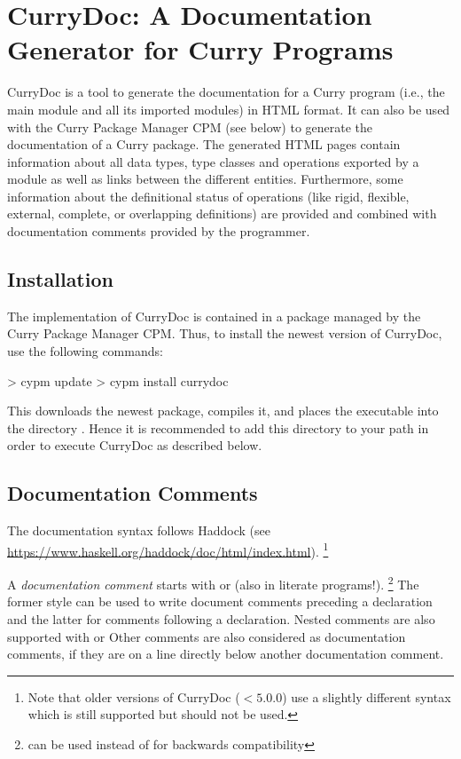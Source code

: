 \section{CurryDoc: A Documentation Generator for Curry Programs}

CurryDoc%
is a tool to generate
the documentation for a Curry program (i.e., the main module
and all its imported modules) in HTML format.
It can also be used with the Curry Package Manager CPM
(see below) to generate the documentation of a Curry package.
The generated HTML pages contain information about
all data types, type classes and operations exported by a module as well
as links between the different entities.
Furthermore, some information about the definitional status
of operations (like rigid, flexible, external, complete, or
overlapping definitions) are provided and combined with
documentation comments provided by the programmer.

\subsection{Installation}

The implementation of CurryDoc is contained in a package
managed by the Curry Package Manager CPM.
Thus, to install the newest version of CurryDoc, use the following commands:
%
\begin{curry}
> cypm update
> cypm install currydoc
\end{curry}
%
This downloads the newest package, compiles it, and places
the executable  into the directory .
Hence it is recommended to add this directory to your path
in order to execute CurryDoc as described below.

\subsection{Documentation Comments}

The documentation syntax follows Haddock
(see \url{https://www.haskell.org/haddock/doc/html/index.html}).%
\footnote{Note that older versions of CurryDoc ($< 5.0.0$)
use a slightly different syntax which is still supported but
should not be used.}

A \emph{documentation comment}%
starts with \ccode{-{}- | } or \ccode{-{}- \textasciicircum }
(also in literate programs!).%
\footnote{\ccode{-{}-{}- } can be used instead of
          \ccode{-{}- | } for backwards compatibility}
The former style can be used to write document comments preceding a declaration
and the latter for comments following a declaration.
Nested comments are also supported with  \ccode{\{- | }
or \ccode{\{- \textasciicircum}
Other comments are also considered as documentation comments, if they are
on a line directly below another documentation comment.

